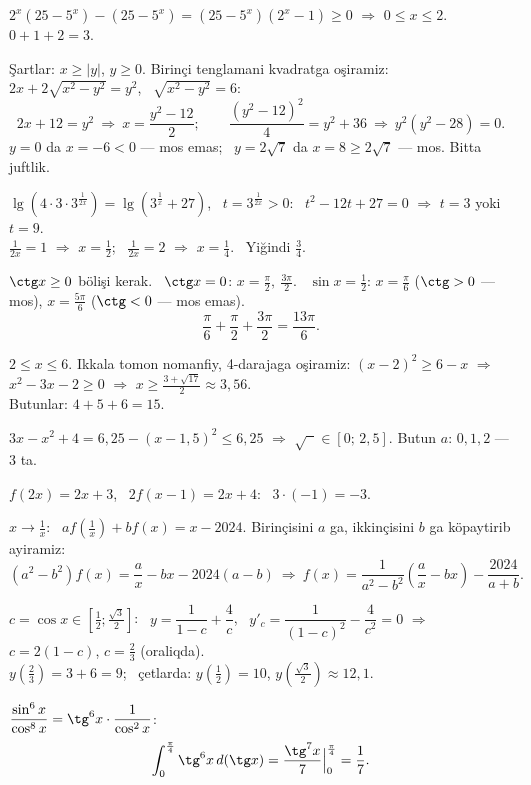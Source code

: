 $2^x\left(25-5^x\right)-\left(25-5^x\right)=\left(25-5^x\right)\left(2^x-1\right)\ge0$ $\Rightarrow$ $0\le x\le2$. \ $0+1+2=3$.

Şartlar: $x\ge|y|$, $y\ge0$. Birinçi tenglamani kvadratga oşiramiz: $2x+2\sqrt{x^2-y^2}=y^2$, \ $\sqrt{x^2-y^2}=6$:
\[2x+12=y^2\ \Rightarrow\ x=\frac{y^2-12}2;\qquad \frac{\left(y^2-12\right)^2}4=y^2+36\ \Rightarrow\ y^2\left(y^2-28\right)=0.\]
$y=0$ da $x=-6<0$ — mos emas; \ $y=2\sqrt7$ da $x=8\ge2\sqrt7$ — mos. Bitta juftlik.

$\lg\left(4\cdot3\cdot3^{\frac1{2x}}\right)=\lg\left(3^{\frac1x}+27\right)$, \ $t=3^{\frac1{2x}}>0$: \ $t^2-12t+27=0$ $\Rightarrow$ $t=3$ yoki $t=9$.\\
$\frac1{2x}=1$ $\Rightarrow$ $x=\frac12$; \ $\frac1{2x}=2$ $\Rightarrow$ $x=\frac14$. \ Yiğindi $\frac34$.

$\ctg x\ge0$ bölişi kerak. \ $\ctg x=0$: $x=\frac\pi2,\ \frac{3\pi}2$. \ $\sin x=\frac12$: $x=\frac\pi6$ ($\ctg>0$ — mos), $x=\frac{5\pi}6$ ($\ctg<0$ — mos emas).
\[\frac\pi6+\frac\pi2+\frac{3\pi}2=\frac{13\pi}6.\]

$2\le x\le6$. Ikkala tomon nomanfiy, 4-darajaga oşiramiz: $(x-2)^2\ge6-x$ $\Rightarrow$ $x^2-3x-2\ge0$ $\Rightarrow$ $x\ge\frac{3+\sqrt{17}}2\approx3{,}56$.\\
Butunlar: $4+5+6=15$.

$3x-x^2+4=6{,}25-(x-1{,}5)^2\le6{,}25$ $\Rightarrow$ $\sqrt{\phantom{x}}\in[0;\,2{,}5]$. Butun $a$: $0,1,2$ — $3$ ta.

$f(2x)=2x+3$, \ $2f(x-1)=2x+4$: \ $3\cdot(-1)=-3$.

$x\to\frac1x$: \ $af\left(\frac1x\right)+bf(x)=x-2024$. Birinçisini $a$ ga, ikkinçisini $b$ ga köpaytirib ayiramiz:
\[\left(a^2-b^2\right)f(x)=\frac ax-bx-2024(a-b)\ \Rightarrow\ f(x)=\frac1{a^2-b^2}\left(\frac ax-bx\right)-\frac{2024}{a+b}.\]

$c=\cos x\in\left[\frac12;\frac{\sqrt3}2\right]$: \ $y=\dfrac1{1-c}+\dfrac4c$, \ $y'_c=\dfrac1{(1-c)^2}-\dfrac4{c^2}=0$ $\Rightarrow$ $c=2(1-c)$, $c=\frac23$ (oraliqda).\\
$y\left(\frac23\right)=3+6=9$; \ çetlarda: $y\left(\frac12\right)=10$, $y\left(\frac{\sqrt3}2\right)\approx12{,}1$.

$\dfrac{\sin^6x}{\cos^8x}=\tg^6x\cdot\dfrac1{\cos^2x}$:
\[\int_0^{\frac\pi4}\tg^6x\,d(\tg x)=\frac{\tg^7x}7\Big|_0^{\frac\pi4}=\frac17.\]

